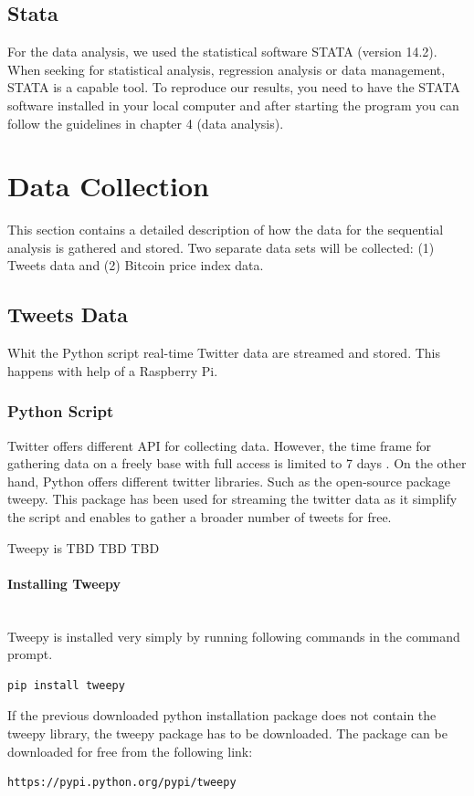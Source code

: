 \documentclass[a4paper,12pt]{article}
\begin{document}
\begin{spacing}{1.2}
\subsection{Stata}
For the data analysis, we used the statistical software STATA (version 14.2). When seeking for statistical analysis, regression analysis or data management, STATA is a capable tool. To reproduce our results, you need to have the STATA software installed in your local computer and after starting the program you can follow the guidelines in chapter 4 (data analysis). 

\clearpage

\section{Data Collection}
This section contains a detailed description of how the data for the sequential analysis is gathered and stored. Two separate data sets will be collected: (1) Tweets data and  (2) Bitcoin price index data.
\subsection{Tweets Data}
Whit the Python script real-time Twitter data are streamed and stored. This happens with help of a Raspberry Pi.
\subsubsection{Python Script}
Twitter offers different API for collecting data. However, the time frame for gathering data on a freely base with full access is limited to 7 days \parencite{twitterinc2017a}. On the other hand, Python offers different twitter libraries. Such as the open-source package tweepy. This package has been used for streaming the twitter data as it simplify the script and enables to gather a broader number of tweets for free.

Tweepy is
TBD
TBD
TBD

\paragraph{Installing Tweepy}\mbox{}\\{}
Tweepy is installed very simply by running following commands in the command prompt. 
\begin{lstlisting}[language=bash]
pip install tweepy
\end{lstlisting}

If the previous downloaded python installation package does not contain the tweepy library, the tweepy package has to be downloaded. The package can be downloaded for free from the following link:
\begin{lstlisting}[language=bash]
https://pypi.python.org/pypi/tweepy
\end{lstlisting}


\end{spacing}
\end{document}
